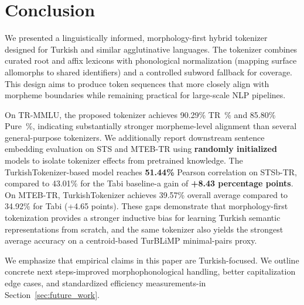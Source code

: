 \section{Conclusion}
\label{sec:conclusion}

We presented a linguistically informed, morphology-first hybrid tokenizer designed for Turkish and similar agglutinative languages. The tokenizer combines curated root and affix lexicons with phonological normalization (mapping surface allomorphs to shared identifiers) and a controlled subword fallback for coverage. This design aims to produce token sequences that more closely align with morpheme boundaries while remaining practical for large-scale NLP pipelines.

On TR-MMLU, the proposed tokenizer achieves 90.29\% TR~\% and 85.80\% Pure~\%, indicating substantially stronger morpheme-level alignment than several general-purpose tokenizers. We additionally report downstream sentence embedding evaluation on STS and MTEB-TR using \textbf{randomly initialized} models to isolate tokenizer effects from pretrained knowledge. The TurkishTokenizer-based model reaches \textbf{51.44\%} Pearson correlation on STSb-TR, compared to 43.01\% for the Tabi baseline-a gain of \textbf{+8.43 percentage points}. On MTEB-TR, TurkishTokenizer achieves 39.57\% overall average compared to 34.92\% for Tabi (+4.65 points). These gaps demonstrate that morphology-first tokenization provides a stronger inductive bias for learning Turkish semantic representations from scratch, and the same tokenizer also yields the strongest average accuracy on a centroid-based TurBLiMP minimal-pairs proxy.

We emphasize that empirical claims in this paper are Turkish-focused. We outline concrete next steps-improved morphophonological handling, better capitalization edge cases, and standardized efficiency measurements-in Section~\ref{sec:future_work}.
